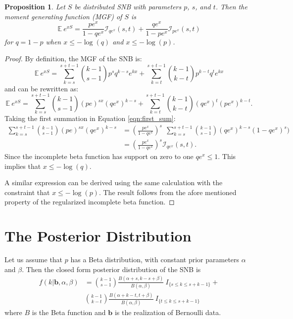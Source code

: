 \documentclass[review]{elsarticle}
\newtheorem{prop}{Proposition}
\begin{document}
\begin{prop} Let $S$ be distributed SNB with parameters $p$, $s$, and $t$.
Then the moment generating function (MGF) of $S$ is
\begin{equation} \label{eqn:mgf}
\mathbb{E}~e^{xS} = \frac{p e^x}{1 - qe^x} \mathcal{I}_{qe^x} (s, t) + 
  \frac{qe^x}{1-pe^x} \mathcal{I}_{pe^x}(s, t)
\end{equation}
for $q = 1-p$ when $x \leq -\log(q)$ and $x \leq -\log(p)$.
\end{prop}
\begin{proof}
By definition, the MGF of the SNB is:
\begin{equation*}
\mathbb{E}~e^{xS} = \sum_{k=s}^{s+t-1} {k-1 \choose s-1} p^s q^{k-s} e^{kx} 
  + \sum_{k=t}^{s+t-1} {k-1 \choose k-t} p^{k-t} q^t e^{kx}
\end{equation*}
and can be rewritten as:
\begin{equation} \label{eqn:first_sum}
\mathbb{E}~e^{xS} = \sum_{k=s}^{s+t-1}{k-1 \choose s-1} (pe)^{sx} (qe^x)^{k-s} 
  + \sum_{k=t}^{s+t-1}{k-1 \choose k-t} (qe^x)^t (pe^x)^{k-t}.
\end{equation}
Taking the first summation in Equation \ref{eqn:first_sum}:
\begin{align*}
\sum_{k=s}^{s+t-1}{k-1 \choose s-1} (pe)^{sx} (qe^x)^{k-s} &= 
  \left(\frac{pe^x}{1 - qe^x}\right)^s \ \ \sum_{k=s}^{s+t-1} {k-1 \choose s-1} 
    (qe^x)^{k-s} (1-qe^x)^s) \\
  &= \left(\frac{pe^x}{1 - qe^x}\right)^s \mathcal{I}_{qe^x}(s, t).
\end{align*}
Since the incomplete beta function has support on zero to one
$qe^x \leq 1$. This implies that $x \leq -\log(q)$.

A similar expression can be derived using the same calculation with
the constraint that $x \leq -\log(p)$. The result
follows from the afore mentioned property of the regularized incomplete
beta function.
\end{proof}

\section{The Posterior Distribution}

Let us assume that $p$ has a Beta distribution, with constant prior
parameters $\alpha$ and $\beta$. Then the closed form
posterior distribution of the SNB is
\begin{align}
f \left(k | \mathbf{b}, \alpha, \beta \right) &= 
  {k-1 \choose s-1} \frac{B\left(\alpha+s, k-s+\beta \right)}{B(\alpha, \beta)} 
  \ I_{\{s \leq k \leq s+k-1\}} + \nonumber \\
  & {k-1 \choose k-t} 
  \frac{B\left(\alpha + k - t, t+\beta\right)}{B(\alpha, \beta)} 
  \ I_{\{t \leq k \leq s+k-1\}}
\end{align}
where $B$ is the Beta function and $\mathbf{b}$ is the realization
of Bernoulli data.
\end{document}

